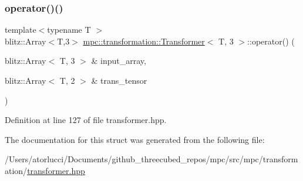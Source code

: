 \subsubsection{\texorpdfstring{operator()()}{operator()()}}
{\footnotesize\ttfamily template$<$typename T $>$ \\
blitz\+::\+Array$<$T,3$>$ \mbox{\hyperlink{structmpc_1_1transformation_1_1_transformer}{mpc\+::transformation\+::\+Transformer}}$<$ T, 3 $>$\+::operator() (\begin{DoxyParamCaption}\item[{blitz\+::\+Array$<$ T, 3 $>$ \&}]{input\+\_\+array,  }\item[{blitz\+::\+Array$<$ T, 2 $>$ \&}]{trans\+\_\+tensor }\end{DoxyParamCaption})\hspace{0.3cm}{\ttfamily [inline]}}



Definition at line 127 of file transformer.\+hpp.



The documentation for this struct was generated from the following file\+:\begin{DoxyCompactItemize}
\item 
/\+Users/atorlucci/\+Documents/github\+\_\+threecubed\+\_\+repos/mpc/src/mpc/transformation/\mbox{\hyperlink{transformer_8hpp}{transformer.\+hpp}}\end{DoxyCompactItemize}
